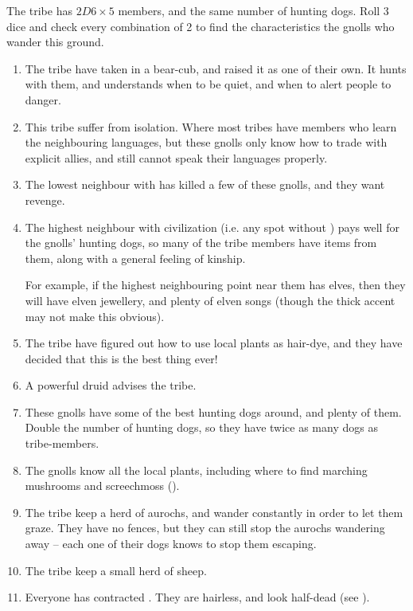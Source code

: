 \begin{multicols}{2}
The tribe has $2D6 \times 5$ members, and the same number of hunting dogs.
Roll 3 dice and check every combination of 2 to find the characteristics the gnolls who wander this ground.

\begin{enumerate}
  \item
  The tribe have taken in a bear-cub, and raised it as one of their own.
  It hunts with them, and understands when to be quiet, and when to alert people to danger.
  \item
  This tribe suffer from isolation.
  Where most tribes have members who learn the neighbouring languages, but these gnolls only know how to trade with explicit allies, and still cannot speak their languages properly.
  \item
  The lowest neighbour with  has killed a few of these gnolls, and they want revenge.
  \item
  The highest neighbour with civilization (i.e. any spot without ) pays well for the gnolls' hunting dogs, so many of the tribe members have items from them, along with a general feeling of kinship.

  For example, if the highest neighbouring point near them has elves, then they will have elven jewellery, and plenty of elven songs (though the thick accent may not make this obvious).
  \item
  The tribe have figured out how to use local plants as hair-dye, and they have decided that this is the best thing ever!
  \index[Dye]
  \item
  A powerful druid advises the tribe.
  \item
  These gnolls have some of the best hunting dogs around, and plenty of them.
  Double the number of hunting dogs, so they have twice as many dogs as tribe-members.
  \item
  The gnolls know all the local plants, including where to find marching mushrooms and screechmoss ().
  \item
  The tribe keep a herd of aurochs, and wander constantly in order to let them graze.
  They have no fences, but they can still stop the aurochs wandering away -- each one of their dogs knows to stop them escaping.
  \item
  The tribe keep a small herd of sheep.
  \item
  Everyone has contracted .
  They are hairless, and look half-dead
  (see ).
\end{enumerate}


\end{multicols}
